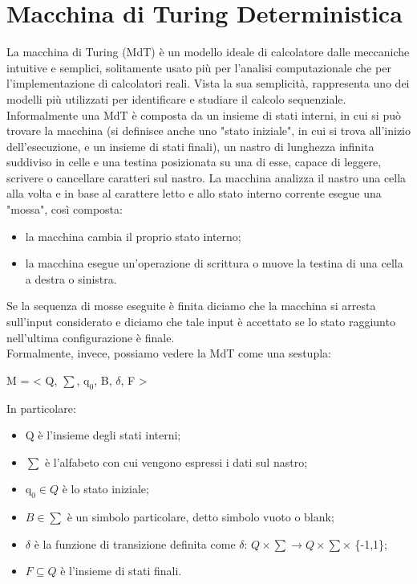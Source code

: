 \section{Macchina di Turing Deterministica}
La macchina di Turing (MdT) è un modello ideale di calcolatore dalle meccaniche intuitive e semplici, solitamente usato più per l'analisi computazionale che per l'implementazione di calcolatori reali. Vista la sua semplicità, rappresenta uno dei modelli più utilizzati per identificare e studiare il calcolo sequenziale.\\
Informalmente una MdT è composta da un insieme di stati interni, in cui si può trovare la macchina (si definisce anche uno "stato iniziale", in cui si trova all'inizio dell'esecuzione, e un insieme di stati finali), un nastro di lunghezza infinita suddiviso in celle e una testina posizionata su una di esse, capace di leggere, scrivere o cancellare caratteri sul nastro. La macchina analizza il nastro una cella alla volta e in base al carattere letto e allo stato interno corrente esegue una "mossa", così composta:
\begin{itemize}
\item{la macchina cambia il proprio stato interno;}
\item{la macchina esegue un'operazione di scrittura o muove la testina di una cella a destra o sinistra.}
\end{itemize}
Se la sequenza di mosse eseguite è finita diciamo che la macchina si arresta sull'input considerato e diciamo che tale input è accettato se lo stato raggiunto nell'ultima configurazione è finale.\\
Formalmente, invece, possiamo vedere la MdT come una sestupla:
\begin{center}
{M = < Q, $\sum$, $\mathrm{q}_{0}$, B, $\delta$, F >\\}
\end{center}
In particolare:
\begin{itemize}
\item{Q è l'insieme degli stati interni;}
\item{$\sum$ è l'alfabeto con cui vengono espressi i dati sul nastro;}
\item{$\mathrm{q}_{0} \in Q$ è lo stato iniziale;}
\item{$B \in \sum$ è un simbolo particolare, detto simbolo vuoto o blank;}
\item{$\delta$ è la funzione di transizione definita come $\delta$: $Q \times \sum \rightarrow  Q \times \sum \times$ \{-1,1\};}
\item{$F \subseteq Q$ è  l'insieme di stati finali.}
\end{itemize}
